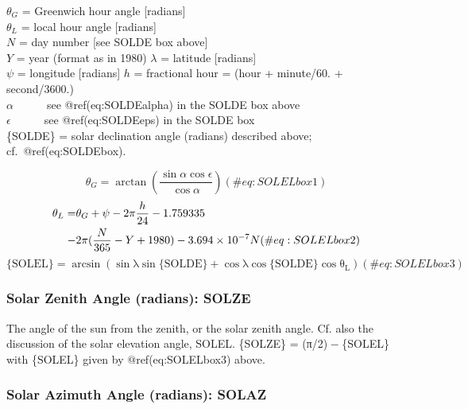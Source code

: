 \documentclass[
  english,
]{book}
\begin{document}
\(\theta_{G}\) = Greenwich hour
angle
{[}radians{]}\\
\(\theta_{L}\) = local hour
angle {[}radians{]}\\
\(N\) = day number {[}see SOLDE box above{]}\\
\(Y\) = year (format as in 1980) \(\lambda\) =
latitude {[}radians{]}\\
\(\psi\) = longitude {[}radians{]}
\(h\) = fractional hour = (hour + minute/60. + second/3600.)\\
\(\alpha\)~~~~~~see @ref(eq:SOLDEalpha) in the SOLDE box above\\
\(\epsilon\)~~~~~~see @ref(eq:SOLDEeps) in the SOLDE box\\
\{SOLDE\} = solar declination angle (radians) described above;
cf.~@ref(eq:SOLDEbox).

\begin{equation}
\theta_{G}=\arctan(\frac{\sin\alpha\cos\epsilon}{\cos\alpha})
(\#eq:SOLELbox1)
\end{equation} \begin{align}
\theta_{L} = & \theta_{G}+\psi-2\pi\frac{h}{24}-1.759335\notag \\
 - &2\pi(\frac{N}{365}-Y+1980)-3.694\times10^{-7}N
(\#eq:SOLELbox2)
\end{align} \begin{equation}
\mathrm{\mathrm{\{SOLEL\}}=\arcsin\left(\sin\lambda\sin\mathrm{\{SOLDE\}+\cos\lambda}\cos\mathrm{\{SOLDE\}}\cos\theta_{L}\right)}
(\#eq:SOLELbox3)
\end{equation}

\hypertarget{solze}{%
\subsubsection*{Solar Zenith Angle (radians): SOLZE}\label{solze}}

The angle of the sun from the zenith, or the solar zenith angle. Cf.
also the discussion of the solar elevation angle, SOLEL.
{\{SOLZE\} = (π/2) − \{SOLEL\}} with \{SOLEL\} given by
@ref(eq:SOLELbox3) above.

\hypertarget{solaz}{%
\subsubsection*{Solar Azimuth Angle (radians): SOLAZ}\label{solaz}}
\end{document}
